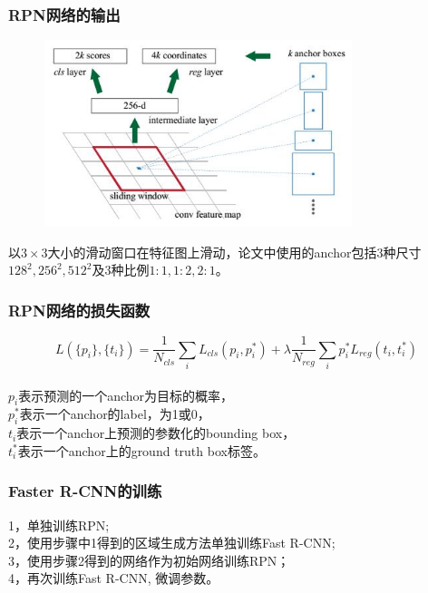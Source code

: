 \documentclass{beamer}
\begin{document}
    \begin{frame}
        \frametitle{RPN网络的输出}
        \begin{figure}
            \centering
            \includegraphics[width=0.8\textwidth]{../graphic/rpnout.jpg}
        \end{figure}
        以$3\times 3$大小的滑动窗口在特征图上滑动，论文中使用的anchor包括$3$种尺寸$128^2,256^2,512^2$及$3$种比例$1:1,1:2,2:1$。
    \end{frame}
    
    \begin{frame}
        \frametitle{RPN网络的损失函数}
        $$L(\{p_i\}, \{t_i\})=\frac{1}{N_{cls}}\sum_i L_{cls}(p_i,p_i^*)+\lambda \frac{1}{N_{reg}}\sum_i p_i^* L_{reg}(t_i,t_i^*)$$ \\
        $p_i$表示预测的一个anchor为目标的概率，\\
        $p_i^*$表示一个anchor的label，为1或0，\\
        $t_i$表示一个anchor上预测的参数化的bounding box，\\
        $t_i^*$表示一个anchor上的ground truth box标签。 
    \end{frame}
    \begin{frame}
        \frametitle{Faster R-CNN的训练}
        1，单独训练RPN;\\
        2，使用步骤中1得到的区域生成方法单独训练Fast R-CNN; \\
        3，使用步骤2得到的网络作为初始网络训练RPN；\\
        4，再次训练Fast R-CNN, 微调参数。\\
    \end{frame}
    
\end{document}
